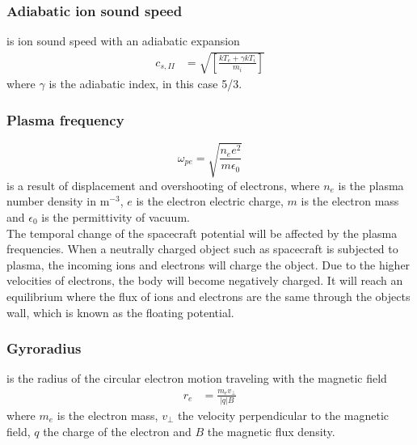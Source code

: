 \documentclass[aip, 
rsi, 
amsmath,
amssymb,
longbibliography,
preprint]{revtex4-1}
\begin{document}
\subsubsection*{Adiabatic ion sound speed}
is ion sound speed with an adiabatic expansion
\begin{align}
c_{s,II} &= \sqrt{\left[ \frac{kT_e + \gamma k T_i}{m_i}\right]}\label{eq:IonSpeed2}
\end{align}
where $\gamma$ is the adiabatic index, in this case 5/3.

\subsubsection*{Plasma frequency}
\begin{equation}
\label{plasmafreq}
\omega_{pe} = \sqrt{\frac{n_e e^2}{m \epsilon_0}}
\end{equation}
is a result of displacement and overshooting of electrons, where $n_e$ is the plasma number density in $\mathrm{m}^{-3}$, $e$ is the electron electric charge, $m$ is the electron mass and $\epsilon_0$ is the permittivity of vacuum. \\
The temporal change of the spacecraft potential will be affected by the plasma frequencies. When a neutrally charged object such as spacecraft is subjected to plasma, the incoming ions and electrons will charge the object. Due to the higher velocities of electrons, the body will become negatively charged. It will reach an equilibrium where the flux of ions and electrons are the same through the objects wall, which is known as the floating potential.\\

\subsubsection*{Gyroradius}
is the radius of the circular electron motion traveling with the magnetic field
\begin{align}
r_e &= \frac{m_e v_\perp}{|q| B}\label{eq:gyroradius}
\end{align}
where $m_e$ is the electron mass, $v_\perp$ the velocity perpendicular to the magnetic field, $q$ the charge of the electron and $B$ the magnetic flux density.





\end{document}
